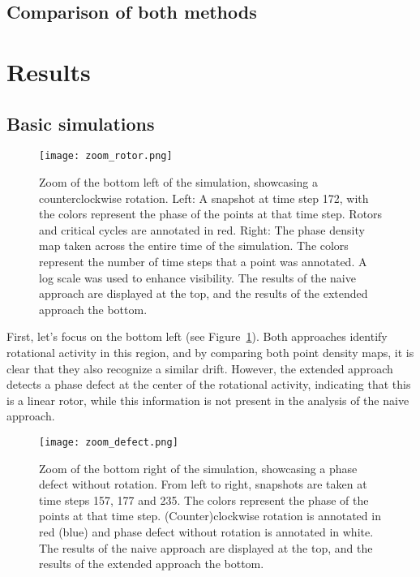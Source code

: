 \documentclass[twocolumn]{article}
\begin{document}
\subsection{Comparison of both methods}

\section{Results}

\subsection{Basic simulations}

\begin{figure}[ht]
  \centering
  \texttt{[image: zoom\_rotor.png]}
  \caption{Zoom of the bottom left of the simulation, showcasing a
    counterclockwise rotation. Left: A snapshot at time step 172, with the
    colors represent the phase of the points at that time step. Rotors and
    critical cycles are annotated in red. Right: The phase density map taken
    across the entire time of the simulation. The colors represent the
    number of time steps that a point was annotated. A log scale was used to
    enhance visibility. The results of the naive approach are displayed at
  the top, and the results of the extended approach the bottom.}
  \label{fig:zoom-rotor}
\end{figure}

First, let's focus on the bottom left (see Figure~\ref{fig:zoom-rotor}).
Both approaches identify rotational activity in this region, and by
comparing both point density maps, it is clear that they also recognize
a similar drift. However, the extended approach detects a phase defect
at the center of the rotational activity, indicating that this is a
linear rotor, while this information is not present in the analysis of
the naive approach.

\begin{figure}[ht]
  \centering
  \texttt{[image: zoom\_defect.png]}
  \caption{Zoom of the bottom right of the simulation, showcasing a phase
    defect without rotation. From left to right, snapshots are taken at time
    steps 157, 177 and 235. The colors represent the phase of the points at
    that time step. (Counter)clockwise rotation is annotated in red (blue)
    and phase defect without rotation is annotated in white. The results of
    the naive approach are displayed at the top, and the results of the
  extended approach the bottom.}
  \label{fig:zoom-defect}
\end{figure}
\end{document}
